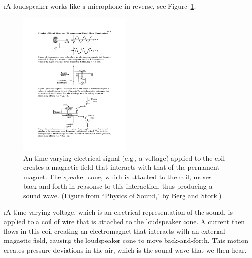 \i A loudspeaker works like a microphone in reverse, see
Figure~\ref{f:loudspeaker}.
%
\begin{figure}[htbp]
\begin{center}
\includegraphics[width=0.5\textwidth]{loudspeaker}
\caption{An time-varying electrical signal (e.g., a voltage) 
applied to the coil creates a magnetic field that interacts 
with that of the permanent magnet.
The speaker cone, which is attached to the coil, 
moves back-and-forth in repsonse to this interaction,
thus producing a sound wave. 
(Figure from ``Physics of Sound," by Berg and Stork.)} 
\label{f:loudspeaker}
\end{center}
\end{figure}
%

\i A time-varying voltage, which is an electrical 
representation of the sound, is applied to a coil of wire 
that is attached to the loudspeaker cone.
A current then flows in this coil creating an electromagnet
that interacts with an external magnetic field, causing
the loudspeaker cone to move back-and-forth.
This motion creates pressure deviations in 
the air, which is the sound wave that we then hear.

